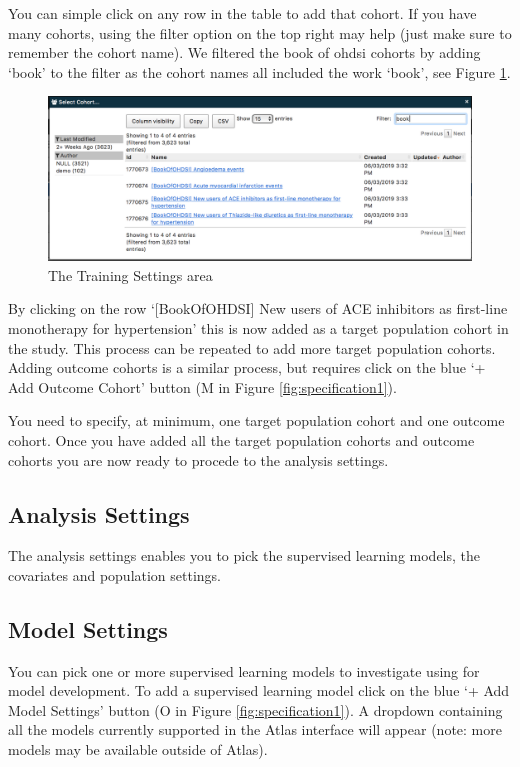 \documentclass[11pt]{book}
\begin{document}
You can simple click on any row in the table to add that cohort. If you
have many cohorts, using the filter option on the top right may help
(just make sure to remember the cohort name). We filtered the book of
ohdsi cohorts by adding `book' to the filter as the cohort names all
included the work `book', see Figure \ref{fig:figure2l}.

\begin{figure}
\includegraphics[width=1\linewidth]{images/PatientLevelPrediction/atlasImplementation/target_pop_cohort_filter} \caption{The Training Settings area}\label{fig:figure2l}
\end{figure}

By clicking on the row `{[}BookOfOHDSI{]} New users of ACE inhibitors as
first-line monotherapy for hypertension' this is now added as a target
population cohort in the study. This process can be repeated to add more
target population cohorts. Adding outcome cohorts is a similar process,
but requires click on the blue `+ Add Outcome Cohort' button (M in
Figure \ref{fig:specification1}).

You need to specify, at minimum, one target population cohort and one
outcome cohort. Once you have added all the target population cohorts
and outcome cohorts you are now ready to procede to the analysis
settings.

\subsection{Analysis Settings}\label{analysis-settings}

The analysis settings enables you to pick the supervised learning
models, the covariates and population settings.

\subsection{Model Settings}\label{model-settings}

You can pick one or more supervised learning models to investigate using
for model development. To add a supervised learning model click on the
blue `+ Add Model Settings' button (O in Figure
\ref{fig:specification1}). A dropdown containing all the models
currently supported in the Atlas interface will appear (note: more
models may be available outside of Atlas).
\end{document}
